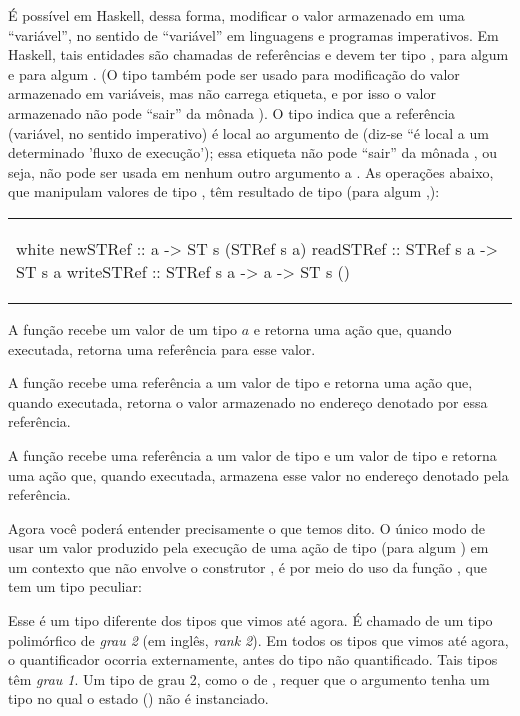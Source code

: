 É possível em Haskell, dessa forma, modificar o valor armazenado em
uma ``variável'', no sentido de ``variável'' em linguagens e programas
imperativos. Em Haskell, tais entidades são chamadas de referências e
devem ter tipo , para algum  e para algum
. (O tipo  também pode ser usado para modificação do
valor armazenado em variáveis, mas não carrega etiqueta, e por isso o
valor armazenado não pode ``sair'' da mônada ). O tipo
 indica que a referência (variável, no sentido
imperativo) é local ao argumento de  (diz-se ``é local a um
determinado 'fluxo de execução'); essa etiqueta não pode ``sair'' da
mônada , ou seja, não pode ser usada em nenhum outro argumento
a .  As operações abaixo, que manipulam valores de tipo
, têm resultado de tipo  (para algum
,):

\begin{center}
\begin{tabular}{l}
\begin{alg}{.5\textwidth}{white}
newSTRef :: a -> ST s (STRef s a)
readSTRef :: STRef s a -> ST s a
writeSTRef :: STRef s a -> a -> ST s ()
\end{alg}
\end{tabular}
\end{center}

A função  recebe um valor de um tipo $a$ e retorna uma
ação que, quando executada, retorna uma referência para esse valor.

A função  recebe uma referência a um valor de tipo
 e retorna uma ação que, quando executada, retorna o valor
armazenado no endereço denotado por essa referência.

A função  recebe uma referência a um valor de tipo 
e um valor de tipo  e retorna uma ação que, quando executada,
armazena esse valor no endereço denotado pela referência.

Agora você poderá entender precisamente o que temos dito. O único modo
de usar um valor produzido pela execução de uma ação de tipo  
(para algum ) em um contexto que não envolve o construtor
, é por meio do uso da função , que tem um tipo
peculiar:


Esse é um tipo diferente dos tipos que vimos até agora. É chamado de
um tipo polimórfico de {\em grau 2\/} (em inglês, {\em rank 2\/}). Em
todos os tipos que vimos até agora, o quantificador 
ocorria externamente, antes do tipo não quantificado. Tais tipos têm
{\em grau 1\/}. Um tipo de grau 2, como o de , requer que o
argumento tenha um tipo no qual o estado () não é instanciado.

